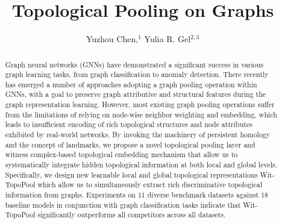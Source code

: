 \documentclass[letterpaper]{article} %
\title{Topological Pooling on Graphs}
\author{
    Yuzhou Chen,$^1$
    Yulia R. Gel$^{2,3}$
}
\begin{document}
\maketitle

\begin{abstract}
Graph neural networks (GNNs) have demonstrated a significant success in various graph learning tasks, from graph classification to anomaly detection. There recently has emerged a number of approaches adopting a graph pooling operation within GNNs, with a goal to preserve graph attributive and structural features during the graph representation learning. However, most existing graph pooling operations suffer from the limitations of relying on node-wise neighbor weighting and embedding, which leads to insufficient encoding of rich topological structures and node attributes exhibited by real-world networks. By invoking the machinery of persistent homology and the concept of landmarks, we propose a novel topological pooling layer and witness complex-based topological embedding mechanism that allow us to systematically integrate hidden topological information at both local and global levels. Specifically, we design new learnable local and global topological representations Wit-TopoPool which allow us to simultaneously extract rich discriminative topological information from graphs. Experiments on 11 diverse benchmark datasets against 18 baseline models in conjunction with graph classification tasks indicate that Wit-TopoPool significantly outperforms all competitors across all datasets.%


\end{abstract}
\end{document}
